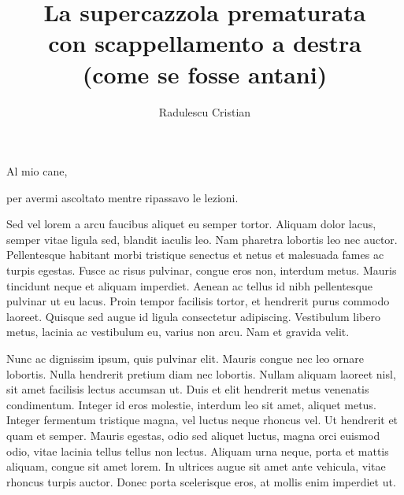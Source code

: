 \documentclass[target=bach,aauheader=,style=]{thud}
\title{La supercazzola prematurata \\ con scappellamento a destra \\ (come se fosse antani)}
\author{Radulescu Cristian}
\begin{document}
\maketitle

\begin{dedication}
	Al mio cane,\par per avermi ascoltato mentre ripassavo le lezioni.
\end{dedication}

\acknowledgements
Sed vel lorem a arcu faucibus aliquet eu semper tortor. Aliquam dolor lacus, semper vitae ligula sed, blandit iaculis leo. Nam pharetra lobortis leo nec auctor. Pellentesque habitant morbi tristique senectus et netus et malesuada fames ac turpis egestas. Fusce ac risus pulvinar, congue eros non, interdum metus. Mauris tincidunt neque et aliquam imperdiet. Aenean ac tellus id nibh pellentesque pulvinar ut eu lacus. Proin tempor facilisis tortor, et hendrerit purus commodo laoreet. Quisque sed augue id ligula consectetur adipiscing. Vestibulum libero metus, lacinia ac vestibulum eu, varius non arcu. Nam et gravida velit.

\abstract
Nunc ac dignissim ipsum, quis pulvinar elit. Mauris congue nec leo ornare lobortis. Nulla hendrerit pretium diam nec lobortis. Nullam aliquam laoreet nisl, sit amet facilisis lectus accumsan ut. Duis et elit hendrerit metus venenatis condimentum. Integer id eros molestie, interdum leo sit amet, aliquet metus. Integer fermentum tristique magna, vel luctus neque rhoncus vel. Ut hendrerit et quam et semper. Mauris egestas, odio sed aliquet luctus, magna orci euismod odio, vitae lacinia tellus tellus non lectus. Aliquam urna neque, porta et mattis aliquam, congue sit amet lorem. In ultrices augue sit amet ante vehicula, vitae rhoncus turpis auctor. Donec porta scelerisque eros, at mollis enim imperdiet ut. 

\tableofcontents



\mainmatter

\end{document}
